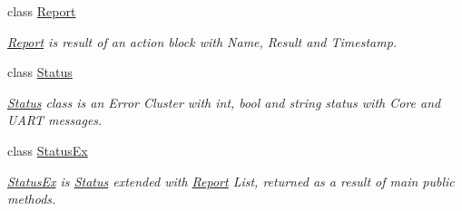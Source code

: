 \begin{DoxyCompactItemize}
class \mbox{\hyperlink{class_b_s_l430___n_e_t_1_1_report}{Report}}
\begin{DoxyCompactList}\small\item\em \mbox{\hyperlink{class_b_s_l430___n_e_t_1_1_report}{Report}} is result of an action block with Name, Result and Timestamp. \end{DoxyCompactList}\item 
class \mbox{\hyperlink{class_b_s_l430___n_e_t_1_1_status}{Status}}
\begin{DoxyCompactList}\small\item\em \mbox{\hyperlink{class_b_s_l430___n_e_t_1_1_status}{Status}} class is an Error Cluster with int, bool and string status with Core and U\+A\+RT messages. \end{DoxyCompactList}\item 
class \mbox{\hyperlink{class_b_s_l430___n_e_t_1_1_status_ex}{Status\+Ex}}
\begin{DoxyCompactList}\small\item\em \mbox{\hyperlink{class_b_s_l430___n_e_t_1_1_status_ex}{Status\+Ex}} is \mbox{\hyperlink{class_b_s_l430___n_e_t_1_1_status}{Status}} extended with \mbox{\hyperlink{class_b_s_l430___n_e_t_1_1_report}{Report}} List, returned as a result of main public methods. \end{DoxyCompactList}\end{DoxyCompactItemize}
